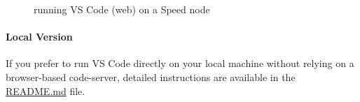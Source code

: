 \begin{figure}[htbp]
	\centering
	\caption{running VS Code (web) on a Speed node}
	\label{fig:vscode}
\end{figure}

\paragraph{Local Version}
\label{sect:local-vscode}
If you prefer to run VS Code directly on your local machine without relying on a browser-based code-server, 
detailed instructions are available in the  \href{https://github.com/NAG-DevOps/speed-hpc/blob/master/src/vscode}{README.md} file.